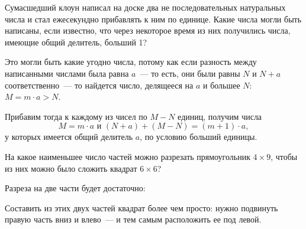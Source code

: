 ﻿


\begin{itemize}
	\itC Сумасшедший клоун написал на доске два не последовательных натуральных числа и стал ежесекундно прибавлять к ним по единице. Какие числа могли быть написаны, если известно, что через некоторое время из них получились числа, имеющие общий делитель, больший 1?
	
	\itr Это могли быть какие угодно числа, потому как если разность между написанными числами была равна $a$~— то есть, они были равны $N$ и $N+a$ соответственно~— то найдется число, делящееся на $a$ и большее $N$: $M= m \cdot a > N$.
	
	Прибавим тогда к каждому из чисел по $M - N$ единиц, получим числа
	$$M = m \cdot a\text{\ \ и\ \ }(N+a) + (M-N) = (m+1) \cdot a,$$
	у которых имеется общий делитель $a$, по условию больший единицы.
\end{itemize}


\begin{itemize}

	\itB На какое наименьшее число частей можно разрезать прямоугольник $4\times 9$, чтобы из них можно было сложить квадрат $6\times 6$? 

	\itr Разреза на две части будет достаточно:
	
	\begin{center}  \end{center}
	
	Составить из этих двух частей квадрат более чем просто: нужно подвинуть правую часть вниз и влево~— и тем самым расположить ее под левой.

\end{itemize}


